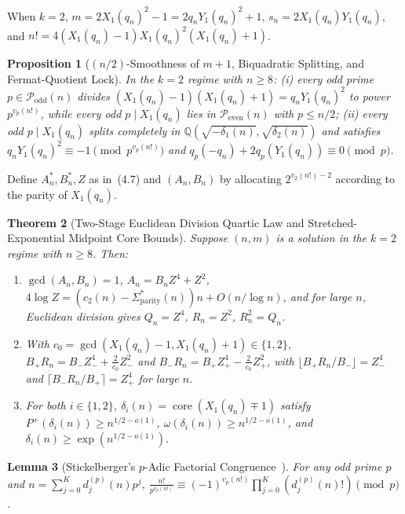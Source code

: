 \documentclass[11pt,reqno]{amsart}
\newtheorem{theorem}{Theorem}[section]
\newtheorem{lemma}[theorem]{Lemma}
\newtheorem{proposition}[theorem]{Proposition}
\theoremstyle{remark}
\newcommand{\Q}{\mathbb{Q}}
\newcommand{\Podd}{\mathcal{P}_{\mathrm{odd}}}
\newcommand{\Peven}{\mathcal{P}_{\mathrm{even}}}
\newcommand{\core}{\operatorname{core}}
\begin{document}
When $k = 2$, $m = 2X_1(q_n)^2 - 1 = 2q_n Y_1(q_n)^2 + 1$, $s_n = 2X_1(q_n)Y_1(q_n)$, and $n! = 4(X_1(q_n) - 1)X_1(q_n)^2(X_1(q_n) + 1)$.

\begin{proposition}[$(n/2)$-Smoothness of $m + 1$, Biquadratic Splitting, and Fermat-Quotient Lock]\label{prop:4.1}
In the $k = 2$ regime with $n \ge 8$: (i) every odd prime $p \in \Podd(n)$ divides $(X_1(q_n)-1)(X_1(q_n)+1) = q_n Y_1(q_n)^2$ to power $p^{v_p(n!)}$, while every odd $p \mid X_1(q_n)$ lies in $\Peven(n)$ with $p \le n/2$; (ii) every odd $p \mid X_1(q_n)$ splits completely in $\Q(\sqrt{-\delta_1(n)}, \sqrt{\delta_2(n)})$ and satisfies $q_n Y_1(q_n)^2 \equiv -1 \pmod{p^{v_p(n!)}}$ and $q_p(-q_n) + 2q_p(Y_1(q_n)) \equiv 0 \pmod p$.
\end{proposition}

Define $A_n^*, B_n^*, Z$ as in~(4.7) and $(A_n, B_n)$ by allocating $2^{v_2(n!)-2}$ according to the parity of $X_1(q_n)$.

\begin{theorem}[Two-Stage Euclidean Division Quartic Law and Stretched-Exponential Midpoint Core Bounds]\label{thm:4.2}
Suppose $(n, m)$ is a solution in the $k = 2$ regime with $n \ge 8$. Then:
\begin{enumerate}
\item[(i)] $\gcd(A_n, B_n) = 1$, $A_n = B_n Z^4 + Z^2$, $4\log Z = (c_2(n) - \Sigma^*_{\mathrm{parity}}(n))n + O(n/\log n)$, and for large $n$, Euclidean division gives $Q_n = Z^4$, $R_n = Z^2$, $R_n^2 = Q_n$.
\item[(ii)] With $c_0 = \gcd(X_1(q_n) - 1, X_1(q_n) + 1) \in \{1, 2\}$, $B_+ R_n = B_- Z_-^4 + \frac{2}{c_0}Z_-^2$ and $B_- R_n = B_+ Z_+^4 - \frac{2}{c_0}Z_+^2$, with $\lfloor B_+ R_n / B_- \rfloor = Z_-^4$ and $\lceil B_- R_n / B_+ \rceil = Z_+^4$ for large $n$.
\item[(iii)] For both $i \in \{1, 2\}$, $\delta_i(n) = \core(X_1(q_n) \mp 1)$ satisfy $P^+(\delta_i(n)) \ge n^{1/2-o(1)}$, $\omega(\delta_i(n)) \ge n^{1/2-o(1)}$, and $\delta_i(n) \ge \exp(n^{1/2-o(1)})$.
\end{enumerate}
\end{theorem}

\begin{lemma}[Stickelberger's $p$-Adic Factorial Congruence~\cite{Stickelberger1890}]\label{lem:4.3}
For any odd prime $p$ and $n = \sum_{j=0}^K d_j^{(p)}(n) p^j$, $\frac{n!}{p^{v_p(n!)}} \equiv (-1)^{v_p(n!)} \prod_{j=0}^K (d_j^{(p)}(n)!) \pmod p$.
\end{lemma}
\end{document}
